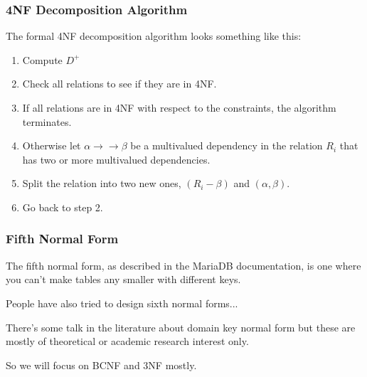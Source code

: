 \begin{frame}
\frametitle{4NF Decomposition Algorithm}

The formal 4NF decomposition algorithm looks something like this:

\begin{enumerate}
	\item Compute $D^{+}$
	\item Check all relations to see if they are in 4NF.
	\item If all relations are in 4NF with respect to the constraints, the algorithm terminates.
	\item Otherwise let $\alpha \rightarrow\rightarrow \beta$ be a multivalued dependency in the relation $R_{i}$ that has two or more multivalued dependencies. 
	\item Split the relation into two new ones, $(R_{i} - \beta)$ and $(\alpha, \beta)$.
	\item Go back to step 2.
\end{enumerate}

\end{frame}



\begin{frame}
\frametitle{Fifth Normal Form}

The fifth normal form, as described in the MariaDB documentation, is one where you can't make tables any smaller with different keys. 

People have also tried to design sixth normal forms... 

There's some talk in the literature about domain key normal form but these are mostly of theoretical or academic research interest only.

So we will focus on BCNF and 3NF mostly.

\end{frame}







